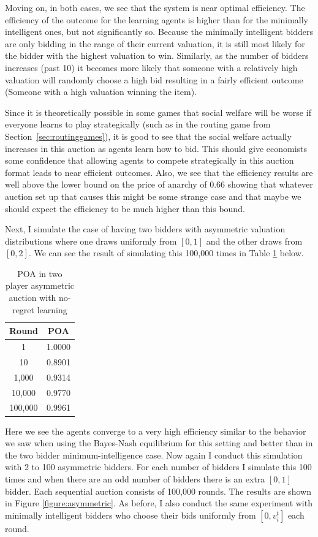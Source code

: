 \documentclass[12pt,twoside]{reedthesis}
\begin{document}
Moving on, in both cases, we see that the system is near optimal efficiency. The efficiency of the outcome for the learning agents is higher than for the minimally intelligent ones, but not significantly so. Because the minimally intelligent bidders are only bidding in the range of their current valuation, it is still most likely for the bidder with the highest valuation to win. Similarly, as the number of bidders increases (past 10) it becomes more likely that someone with a relatively high valuation will randomly choose a high bid resulting in a fairly efficient outcome (Someone with a high valuation winning the item). 

Since it is theoretically possible in some games that social welfare will be worse if everyone learns to play strategically (such as in the routing game from Section~\ref{sec:routinggames}), it is good to see that the social welfare actually increases in this auction as agents learn how to bid. This should give economists some confidence that allowing agents to compete strategically in this auction format leads to near efficient outcomes. Also, we see that the efficiency results are well above the lower bound on the price of anarchy of $0.66$ showing that whatever auction set up that causes this might be some strange case and that maybe we should expect the efficiency to be much higher than this bound.

Next, I simulate the case of having two bidders with asymmetric valuation distributions where one draws uniformly from $[0,1]$ and the other draws from $[0,2]$. We can see the result of simulating this 100,000 times in Table \ref{table:5} below.

\begin{table}[h!]
	\begin{center}
		\begin{tabular}{ |c|c| }
			\hline
			Round & POA \\
			\hline
			1 & 1.0000 \\
			10 & 0.8901 \\
			1,000 & 0.9314 \\
			10,000 & 0.9770 \\
			100,000 & 0.9961 \\
			\hline
		\end{tabular}
		\caption{POA in two player asymmetric auction with no-regret learning}
		\label{table:5}
	\end{center} 
\end{table}

Here we see the agents converge to a very high efficiency similar to the behavior we saw when using the Bayes-Nash equilibrium for this setting and better than in the two bidder minimum-intelligence case. Now again I conduct this simulation with 2 to 100 asymmetric bidders. For each number of bidders I simulate this 100 times and when there are an odd number of bidders there is an extra $[0,1]$ bidder. Each sequential auction consists of 100,000 rounds. The results are shown in Figure \ref{figure:asymmetric}. As before, I also conduct the same experiment with minimally intelligent bidders who choose their bids uniformly from $[0,v_i^t]$ each round.
\end{document}
